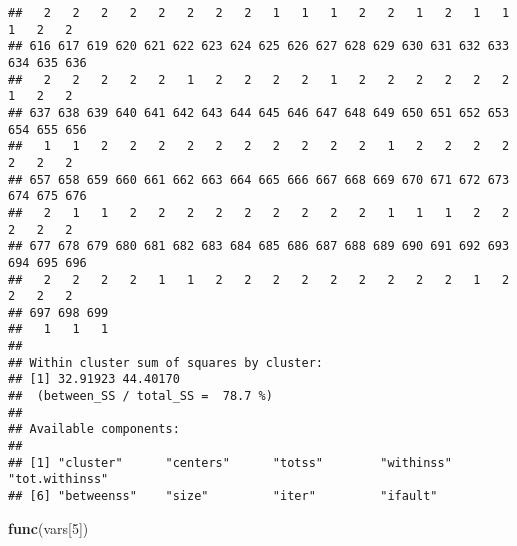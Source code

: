 \documentclass[]{article}
\newenvironment{Shaded}{\begin{snugshade}}{\end{snugshade}}
\newcommand{\DecValTok}[1]{\textcolor[rgb]{0.00,0.00,0.81}{#1}}
\newcommand{\KeywordTok}[1]{\textcolor[rgb]{0.13,0.29,0.53}{\textbf{#1}}}
\newcommand{\NormalTok}[1]{#1}
\begin{document}
\begin{verbatim}
##   2   2   2   2   2   2   2   2   1   1   1   2   2   1   2   1   1   1   2   2 
## 616 617 619 620 621 622 623 624 625 626 627 628 629 630 631 632 633 634 635 636 
##   2   2   2   2   2   1   2   2   2   2   1   2   2   2   2   2   2   1   2   2 
## 637 638 639 640 641 642 643 644 645 646 647 648 649 650 651 652 653 654 655 656 
##   1   1   2   2   2   2   2   2   2   2   2   2   1   2   2   2   2   2   2   2 
## 657 658 659 660 661 662 663 664 665 666 667 668 669 670 671 672 673 674 675 676 
##   2   1   1   2   2   2   2   2   2   2   2   2   1   1   1   2   2   2   2   2 
## 677 678 679 680 681 682 683 684 685 686 687 688 689 690 691 692 693 694 695 696 
##   2   2   2   2   1   1   2   2   2   2   2   2   2   2   2   1   2   2   2   2 
## 697 698 699 
##   1   1   1 
## 
## Within cluster sum of squares by cluster:
## [1] 32.91923 44.40170
##  (between_SS / total_SS =  78.7 %)
## 
## Available components:
## 
## [1] "cluster"      "centers"      "totss"        "withinss"     "tot.withinss"
## [6] "betweenss"    "size"         "iter"         "ifault"
\end{verbatim}

\begin{Shaded}
\begin{Highlighting}[]
\KeywordTok{func}\NormalTok{(vars[}\DecValTok{5}\NormalTok{])}
\end{Highlighting}
\end{Shaded}
\end{document}
